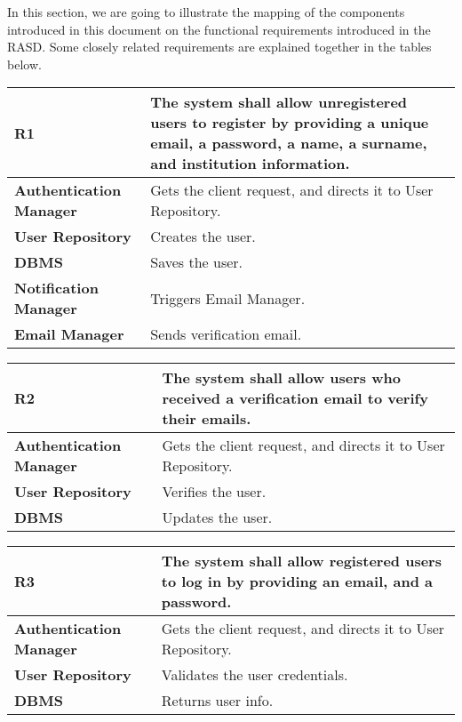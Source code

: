 In this section, we are going to illustrate the mapping of the components introduced in this document on the functional requirements introduced in the RASD. Some closely related requirements are explained together in the tables below.

\begin{table}[h!]
  \centering
  \begin{tabular}{lp{12cm}}
    \hline
    \textbf{R1} & The system shall allow unregistered users to register by providing a unique email, a password, a name, a surname, and institution information. \\
    \hline
    \hline
    \textbf{Authentication Manager} & Gets the client request, and directs it to User Repository. \\
    \textbf{User Repository} &  Creates the user.\\
    \textbf{DBMS} & Saves the user. \\
    \textbf{Notification Manager} &  Triggers Email Manager.\\
    \textbf{Email Manager} &  Sends verification email.\\
    \hline
  \end{tabular}
\end{table}

\begin{table}[h!]
  \centering
  \begin{tabular}{lp{12cm}}
    \hline
    \textbf{R2} & The system shall allow users who received a verification email to verify their emails. \\
    \hline
    \hline
    \textbf{Authentication Manager} & Gets the client request, and directs it to User Repository. \\
    \textbf{User Repository} &  Verifies the user.\\
    \textbf{DBMS} & Updates the user. \\
    \hline
  \end{tabular}
\end{table}

\begin{table}[h!]
  \centering
  \begin{tabular}{lp{12cm}}
    \hline
    \textbf{R3} & The system shall allow registered users to log in by providing an email, and a password. \\
    \hline
    \hline
    \textbf{Authentication Manager} & Gets the client request, and directs it to User Repository. \\
    \textbf{User Repository} &  Validates the user credentials.\\
    \textbf{DBMS} & Returns user info. \\
    \hline
  \end{tabular}
\end{table}

